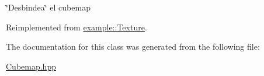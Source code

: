 \char`\"{}\+Desbindea\char`\"{} el cubemap 



Reimplemented from \mbox{\hyperlink{classexample_1_1_texture}{example\+::\+Texture}}.



The documentation for this class was generated from the following file\+:\begin{DoxyCompactItemize}
\item 
\mbox{\hyperlink{_cubemap_8hpp}{Cubemap.\+hpp}}\end{DoxyCompactItemize}
